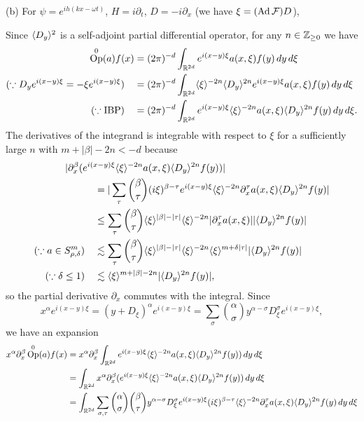 \documentclass{../../large}
\DeclareMathOperator{\Op}{Op}
\begin{document}
\begin{pf}
(b)
For $\psi=e^{ih(kx-\omega t)}$, $H=i\partial_t$, $D=-i\partial_x$
 (we have $\xi=(\operatorname{Ad}\mathcal{F})D$),

Since $\langle D_y\rangle^2$ is a self-adjoint partial differential operator, for any $n\in\mathbb{Z}_{\ge0}$ we have
\begin{align*}
\Op^0(a)f(x)
&=(2\pi)^{-d}\int_{\R^{2d}}e^{i(x-y)\xi}a(x,\xi)f(y)\,dy\,d\xi\\
(\because D_ye^{i(x-y)\xi}=-\xi e^{i(x-y)\xi})\quad
&=(2\pi)^{-d}\int_{\R^{2d}}\<\xi\>^{-2n}\<D_y\>^{2n}e^{i(x-y)\xi}a(x,\xi)f(y)\,dy\,d\xi\\
(\because\text{IBP})\quad
&=(2\pi)^{-d}\int_{\R^{2d}}e^{i(x-y)\xi}\<\xi\>^{-2n}a(x,\xi)\<D_y\>^{2n}f(y)\,dy\,d\xi.
\end{align*}
The derivatives of the integrand is integrable with respect to $\xi$ for a sufficiently large $n$ with $m+|\beta|-2n<-d$ because
\begin{align*}
&\hspace{-3em}|\partial_x^\beta(e^{i(x-y)\xi}\<\xi\>^{-2n}a(x,\xi)\<D_y\>^{2n}f(y))|\\
&=|\sum_\tau{\beta\choose\tau}(i\xi)^{\beta-\tau}e^{i(x-y)\xi}\<\xi\>^{-2n}\partial_x^\tau a(x,\xi)\<D_y\>^{2n}f(y)|\\
&\le\sum_\tau{\beta\choose\tau}\<\xi\>^{|\beta|-|\tau|}\<\xi\>^{-2n}|\partial_x^\tau a(x,\xi)||\<D_y\>^{2n}f(y)|\\
(\because a\in S_{\rho,\delta}^m)\quad
&\lesssim\sum_\tau{\beta\choose\tau}\<\xi\>^{|\beta|-|\tau|}\<\xi\>^{-2n}\<\xi\>^{m+\delta|\tau|}|\<D_y\>^{2n}f(y)|\\
(\because\delta\le1)\quad
&\lesssim\<\xi\>^{m+|\beta|-2n}|\<D_y\>^{2n}f(y)|,
\end{align*}
so the partial derivative $\partial_x$ commutes with the integral.
Since
\[x^\alpha e^{i(x-y)\xi}=(y+D_\xi)^\alpha e^{i(x-y)\xi}=\sum_{\sigma}{\alpha\choose\sigma}y^{\alpha-\sigma}D_\xi^\sigma e^{i(x-y)\xi},\]
we have an expansion
\begin{align*}
x^\alpha\partial_x^\beta\Op^0(a)f(x)
&=x^\alpha\partial_x^\beta\int_{\R^{2d}}e^{i(x-y)\xi}\<\xi\>^{-2n}a(x,\xi)\<D_y\>^{2n}f(y))\,dy\,d\xi\\
&=\int_{\R^{2d}}x^\alpha\partial_x^\beta(e^{i(x-y)\xi}\<\xi\>^{-2n}a(x,\xi)\<D_y\>^{2n}f(y))\,dy\,d\xi\\
&=\int_{\R^{2d}}\sum_{\sigma,\tau}{\alpha\choose\sigma}{\beta\choose\tau}y^{\alpha-\sigma}D_\xi^{\sigma}e^{i(x-y)\xi}(i\xi)^{\beta-\tau}\<\xi\>^{-2n}\partial_x^\tau a(x,\xi)\<D_y\>^{2n}f(y)\,dy\,d\xi\\

\end{align*}
\end{pf}
\end{document}
